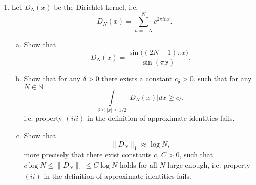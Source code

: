 \documentclass[a4paper]{article}
\newcommand{\Q}{\mathbb{Q}}
\begin{document}
\begin{enumerate}
\begin{proof}
    Thus, $\{f_{k_n}\}$ is a uniformly bounded and equicontinuous sequence of functions. Therefore, by Arzela-Ascoli, there is a further subsequence
    (which we will continue denoting by $\{ f_{k_n} \}$ that converges uniformly.

    Because $\{ f_{k_n} \}$ is a uniformly convergent sequence of continuous functions, it converges to a continuous function $f(x)$. As already
    stated $f(q) = 0$ for all $q \in \Q$, therefore $\|f\|_{L^2} = 0$. $f_{k_n} \to f$ uniformly implies $f_{k_n} \to f$ in $L^2$. Therefore,
    $\|f_{k_n}\|_{L^2} \to 0$, which contradicts $\|f_k\|_{L^2} = 1$ for all $k$. Therefore, there must be a point $x_1 \in [0,1]$ such that
    $f_{k_n}(x_1) \to y$ for some subsequence $\{ f_{k_n} \}$ and some $y \neq 0$.

    Let $\varepsilon>0$ with $\varepsilon < \frac{y}{2}$. Then for $n$ sufficiently large and $x \in [x_1 - \frac{y}{2C}, x_1 + \frac{y}{2C}]$ where $C$ is the uniform bound on the
    dervatives, $|f_{k_n}(x)| \geq \frac{y}{2} - \varepsilon.$ Then
    \begin{align*}
      \langle f_{k_n}, \chi_{[x_1 - \frac{y}{2C}, x_1 + \frac{y}{2C}]} \rangle_{L^2} &= \int_{x_1 - \frac{y}{2C}}^{x_1 + \frac{y}{2C}} |f_{k_n}(x)|^2 dx \\
      &\geq \frac{y}{C} \left( \frac{y}{2} - \varepsilon \right) > 0
    \end{align*}

    But an orthonormal system in a Hilbert space must converge weakly to 0, so we have reached a contradiction. Therefore, $\{ f'_k \}$ cannot be
    uniformly bounded.

  \end{proof}

\item Let $D_N (x)$ be the Dirichlet kernel, i.e. $$ D_N (x) = \sum_{n=-N}^N e^{2\pi i nx}. $$

\begin{enumerate}[(a)]
\item Show that $$ D_N (x)  = \frac{\sin \big( (2N+1) \pi x\big)}{ \sin (\pi x)}. $$
\item Show that for any $\delta > 0$ there exists a constant $c_\delta >0$, such that for any $N \in \mathbb N$ $$ \int\limits_{\delta \le |x| \le 1/2} |D_N (x) | dx \ge c_\delta,$$
i.e. property $(iii)$ in the definition of approximate identities fails.
\item Show that   $$ \| D_N \|_1 \approx \log N,$$ more precisely that there exist constants $c$, $C>0$, such that $ c\log N \le  \| D_N \|_1 \le C \log N$ holds for all $N$ large enough,  i.e. property $(ii)$ in the definition of approximate identities fails.


\end{enumerate}
\end{enumerate}
\end{document}
